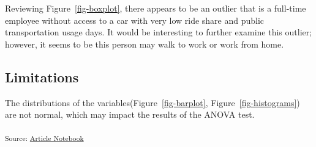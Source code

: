 \documentclass[
  letterpaper,
  DIV=11,
  numbers=noendperiod]{scrartcl}
\begin{document}
Reviewing Figure~\ref{fig-boxplot}, there appears to be an outlier that
is a full-time employee without access to a car with very low ride share
and public transportation usage days. It would be interesting to further
examine this outlier; however, it seems to be this person may walk to
work or work from home.

\subsection{Limitations}\label{limitations}

The distributions of the variables(Figure~\ref{fig-barplot},
Figure~\ref{fig-histograms}) are not normal, which may impact the
results of the ANOVA test.

\textsubscript{Source:
\href{https://RachelRapier.github.io/psych_755_project/index.qmd.html}{Article
Notebook}}
\end{document}
